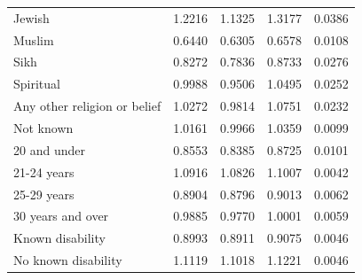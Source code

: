 \documentclass[11pt,a4paper]{article}
\begin{document}
\begin{table}[t]
\begin{center}
\begin{tabular}{lrrrr}
                      Jewish &      1.2216 &              1.1325 &              1.3177 &          0.0386 \\
                      Muslim &      0.6440 &              0.6305 &              0.6578 &          0.0108 \\
                        Sikh &      0.8272 &              0.7836 &              0.8733 &          0.0276 \\
                   Spiritual &      0.9988 &              0.9506 &              1.0495 &          0.0252 \\
Any other religion or belief &      1.0272 &              0.9814 &              1.0751 &          0.0232 \\
                   Not known &      1.0161 &              0.9966 &              1.0359 &          0.0099 \\
\midrule                   
                20 and under &      0.8553 &              0.8385 &              0.8725 &          0.0101 \\
                 21-24 years &      1.0916 &              1.0826 &              1.1007 &          0.0042 \\
                 25-29 years &      0.8904 &              0.8796 &              0.9013 &          0.0062 \\
           30 years and over &      0.9885 &              0.9770 &              1.0001 &          0.0059 \\
\midrule           
            Known disability &      0.8993 &              0.8911 &              0.9075 &          0.0046 \\
         No known disability &      1.1119 &              1.1018 &              1.1221 &          0.0046 \\
\bottomrule
\end{tabular}
\newline
\end{center}
\end{table}


\end{document}
